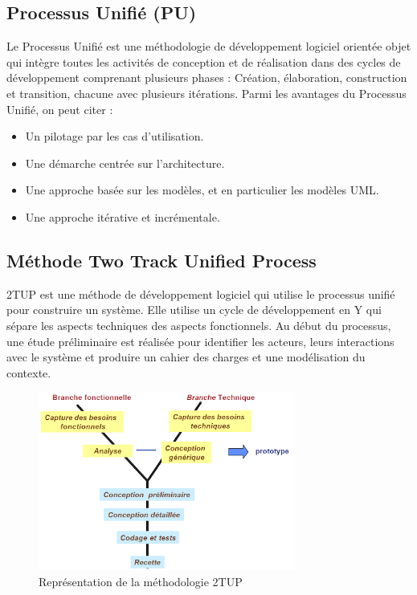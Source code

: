\subsection{Processus Unifié (PU)}
Le Processus Unifié est une méthodologie de développement logiciel orientée objet qui intègre toutes les activités de conception et de réalisation dans des cycles de développement comprenant plusieurs phases : Création, élaboration, construction et transition, chacune avec plusieurs itérations.
Parmi les avantages du Processus Unifié, on peut citer :
\begin{itemize}[itemsep=2pt, parsep=2pt]
    \item Un pilotage par les cas d’utilisation.
    \item Une démarche centrée sur l’architecture.
    \item Une approche basée sur les modèles, et en particulier les modèles UML.
    \item Une approche itérative et incrémentale.
\end{itemize}

\subsection{Méthode Two Track Unified Process}
2TUP est une méthode de développement logiciel qui utilise le processus unifié pour construire un système. Elle utilise un cycle de développement en Y qui sépare les aspects techniques des aspects fonctionnels. Au début du processus, une étude préliminaire est réalisée pour identifier les acteurs, leurs interactions avec le système et produire un cahier des charges et une modélisation du contexte.

\begin{figure}[H]
    \centering
    \includegraphics[width=0.75\textwidth,height=0.65\textwidth]{images/chapitre-1/2tup.png}
    \caption{Représentation de la méthodologie 2TUP \cite{2tup}}
    \label{fig:2tup-image}    
\end{figure}

